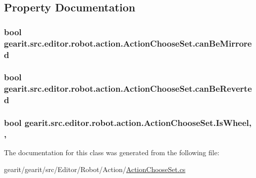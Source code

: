 \subsection{Property Documentation}
\hypertarget{classgearit_1_1src_1_1editor_1_1robot_1_1action_1_1_action_choose_set_adf987d057c0e48b08364409c8eacea99}{
\subsubsection[{can\+Be\+Mirrored}]{\setlength{\rightskip}{0pt plus 5cm}bool gearit.\+src.\+editor.\+robot.\+action.\+Action\+Choose\+Set.\+can\+Be\+Mirrored\hspace{0.3cm}{\ttfamily [get]}}}\label{classgearit_1_1src_1_1editor_1_1robot_1_1action_1_1_action_choose_set_adf987d057c0e48b08364409c8eacea99}
\hypertarget{classgearit_1_1src_1_1editor_1_1robot_1_1action_1_1_action_choose_set_a3eb64837f9f3d73381a25c5911951dc3}{
\subsubsection[{can\+Be\+Reverted}]{\setlength{\rightskip}{0pt plus 5cm}bool gearit.\+src.\+editor.\+robot.\+action.\+Action\+Choose\+Set.\+can\+Be\+Reverted\hspace{0.3cm}{\ttfamily [get]}}}\label{classgearit_1_1src_1_1editor_1_1robot_1_1action_1_1_action_choose_set_a3eb64837f9f3d73381a25c5911951dc3}
\hypertarget{classgearit_1_1src_1_1editor_1_1robot_1_1action_1_1_action_choose_set_ab775c566eda157b051c2178ccd021e6e}{
\subsubsection[{Is\+Wheel}]{\setlength{\rightskip}{0pt plus 5cm}bool gearit.\+src.\+editor.\+robot.\+action.\+Action\+Choose\+Set.\+Is\+Wheel\hspace{0.3cm}{\ttfamily [static]}, {\ttfamily [get]}, {\ttfamily [set]}}}\label{classgearit_1_1src_1_1editor_1_1robot_1_1action_1_1_action_choose_set_ab775c566eda157b051c2178ccd021e6e}


The documentation for this class was generated from the following file\+:\begin{DoxyCompactItemize}
\item 
gearit/gearit/src/\+Editor/\+Robot/\+Action/\hyperlink{_action_choose_set_8cs}{Action\+Choose\+Set.\+cs}\end{DoxyCompactItemize}
